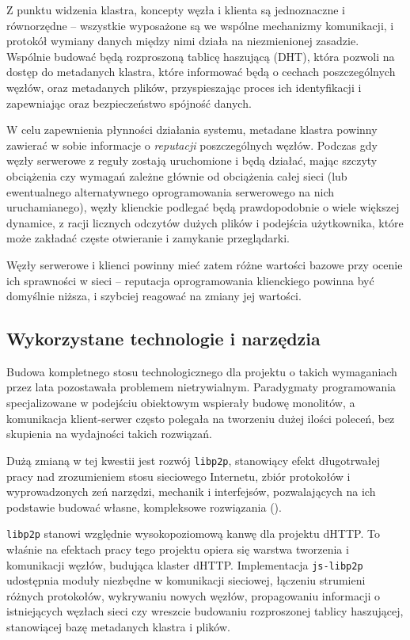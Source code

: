 Z punktu widzenia klastra, koncepty węzła i klienta są jednoznaczne i równorzędne -- wszystkie wyposażone są we wspólne mechanizmy komunikacji, i protokół wymiany danych między nimi działa na niezmienionej zasadzie. Wspólnie budować będą rozproszoną tablicę haszującą (DHT), która pozwoli na dostęp do metadanych klastra, które informować będą o cechach poszczególnych węzłów, oraz metadanych plików, przyspieszając proces ich identyfikacji i zapewniając oraz bezpieczeństwo spójność danych.

W celu zapewnienia płynności działania systemu, metadane klastra powinny zawierać w sobie informacje o {\em reputacji} poszczególnych węzłów. Podczas gdy węzły serwerowe z reguły zostają uruchomione i będą działać, mając szczyty obciążenia czy wymagań zależne głównie od obciążenia całej sieci (lub ewentualnego alternatywnego oprogramowania serwerowego na nich uruchamianego), węzły klienckie podlegać będą prawdopodobnie o wiele większej dynamice, z racji licznych odczytów dużych plików i podejścia użytkownika, które może zakładać częste otwieranie i zamykanie przeglądarki.

Węzły serwerowe i klienci powinny mieć zatem różne wartości bazowe przy ocenie ich sprawności w sieci -- reputacja oprogramowania klienckiego powinna być domyślnie niższa, i szybciej reagować na zmiany jej wartości.

\subsection{Wykorzystane technologie i narzędzia}
\label{sec:techNTools}

Budowa kompletnego stosu technologicznego dla projektu o takich wymaganiach przez lata pozostawała problemem nietrywialnym. Paradygmaty programowania specjalizowane w podejściu obiektowym wspierały budowę monolitów, a komunikacja klient-serwer często polegała na tworzeniu dużej ilości poleceń, bez skupienia na wydajności takich rozwiązań.

Dużą zmianą w tej kwestii jest rozwój \texttt{libp2p}, stanowiący efekt długotrwałej pracy nad zrozumieniem stosu sieciowego Internetu, zbiór protokołów i wyprowadzonych zeń narzędzi, mechanik i interfejsów, pozwalających na ich podstawie budować własne, kompleksowe rozwiązania (\cite{libp2p-specs}).

\texttt{libp2p} stanowi względnie wysokopoziomową kanwę dla projektu dHTTP. To właśnie na efektach pracy tego projektu opiera się warstwa tworzenia i komunikacji węzłów, budująca klaster dHTTP. Implementacja \texttt{js-libp2p} udostępnia moduły niezbędne w komunikacji sieciowej, łączeniu strumieni różnych protokołów, wykrywaniu nowych węzłów, propagowaniu informacji o istniejących węzłach sieci czy wreszcie budowaniu rozproszonej tablicy haszującej, stanowiącej bazę metadanych klastra i plików.


